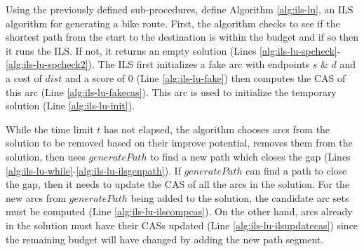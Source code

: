 \documentclass[11pt]{article}
\begin{document}
Using the previously defined sub-procedures, \citeauthor{lu2015arc} define Algorithm \ref{alg:ils-lu}, an ILS algorithm for generating a bike route. First, the algorithm checks to see if the shortest path from the start to the destination is within the budget and if so then it runs the ILS. If not, it returns an empty solution (Lines \ref{alg:ils-lu-spcheck}-\ref{alg:ils-lu-spcheck2}). The ILS first initializes a fake arc with endpoints $s$ \& $d$ and a cost of $dist$ and a score of 0 (Line \ref{alg:ils-lu-fake}) then computes the CAS of this arc (Line \ref{alg:ils-lu-fakecas}). This arc is used to initialize the temporary solution (Line \ref{alg:ils-lu-init}).

While the time limit $t$ has not elapsed, the algorithm chooses arcs from the solution to be removed based on their improve potential, removes them from the solution, then uses $generatePath$ to find a new path which closes the gap (Lines \ref{alg:ils-lu-while}-\ref{alg:ils-lu-ilsgenpath}). If $generatePath$ can find a path to close the gap, then it needs to update the CAS of all the arcs in the solution. For the new arcs from $generatePath$ being added to the solution, the candidate arc sets must be computed (Line \ref{alg:ils-lu-ilscompcas}). On the other hand, arcs already in the solution must have their CASs updated (Line \ref{alg:ils-lu-ilsupdatecas}) since the remaining budget will have changed by adding the new path segment. 
\end{document}
